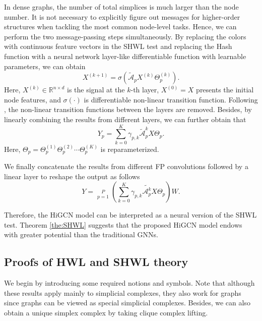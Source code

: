 \documentclass[letterpaper]{article} \usepackage{aaai24}
\theoremstyle{plain}
\theoremstyle{definition}
\theoremstyle{remark}
\begin{document}
In dense graphs, the number of total simplices is much larger than the node number. It is not necessary to explicitly figure out messages for higher-order structures when tackling the most common node-level tasks. 
Hence, we can perform the two message-passing steps simultaneously. By replacing the colors with continuous feature vectors in the SHWL test and replacing the Hash function with a neural network layer-like differentiable function with learnable parameters, we can obtain 
\begin{equation}
    X^{(k+1)} = \sigma \left(\tilde{\mathcal{A}}_p X^{(k)}\Theta_p^{(k)} \right).
\end{equation}
Here, $X^{(k)} \in \mathbb{R}^{n\times d}$ is the signal at the $k$-th layer, $X^{(0)}=X$ presents the initial node features, and $\sigma(\cdot)$ is differentiable non-linear transition function. Following \cite{SGC}, the non-linear transition functions between the layers are removed.
Besides, by linearly combining the results from different layers, we can further obtain that 
\begin{equation}
   Y_p = \sum_{k=0}^K\gamma_{p,k}\tilde{\mathcal{A}}_p^k X\Theta_p.
\end{equation}
Here, $\Theta_p = \Theta_p^{(1)}\Theta_p^{(2)}\cdots\Theta_p^{(K)}$ is reparameterized. 

We finally concatenate the results from different FP convolutions followed by a linear layer to reshape the output as follows
\begin{equation}
    Y =   \mathop{\Big|\!\Big|}\limits_{p=1}^P \left(\sum_{k=0}^K \gamma_{p,k} \tilde{\mathcal{A}_p^k} X \Theta_p \right) W .
\end{equation}

Therefore, the HiGCN model can  be interpreted as a neural version of the SHWL test. Theorem \ref{the:SHWL} suggests that the proposed HiGCN model endows with greater potential than the traditional GNNs.

\subsection{Proofs of HWL and SHWL theory}
\label{appendix: proofs_HWL_SHWL}

We begin by introducing some required notions and symbols. Note that although these results apply mainly to simplicial complexes, they also work for graphs since graphs can be viewed as special simplicial complexes. Besides, we can also obtain a unique simplex complex by taking clique complex lifting. 
\end{document}
